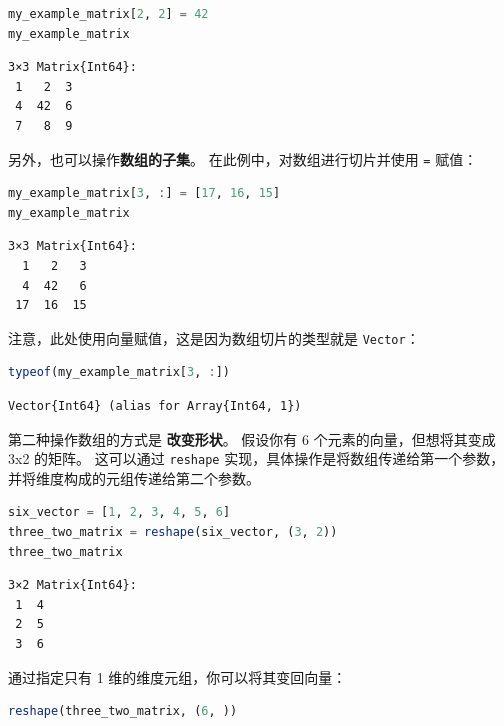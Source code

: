 \documentclass[
  notoc %
]{tufte-book}
\newcommand{\passthrough}[1]{#1}
\begin{document}
\begin{lstlisting}[language=Julia]
my_example_matrix[2, 2] = 42
my_example_matrix
\end{lstlisting}

\begin{lstlisting}[language=Output]
3×3 Matrix{Int64}:
 1   2  3
 4  42  6
 7   8  9
\end{lstlisting}

另外，也可以操作\textbf{数组的子集}。 在此例中，对数组进行切片并使用
\passthrough{\lstinline!=!} 赋值：

\begin{lstlisting}[language=Julia]
my_example_matrix[3, :] = [17, 16, 15]
my_example_matrix
\end{lstlisting}

\begin{lstlisting}[language=Output]
3×3 Matrix{Int64}:
  1   2   3
  4  42   6
 17  16  15
\end{lstlisting}

注意，此处使用向量赋值，这是因为数组切片的类型就是
\passthrough{\lstinline!Vector!}：

\begin{lstlisting}[language=Julia]
typeof(my_example_matrix[3, :])
\end{lstlisting}

\begin{lstlisting}[language=Output]
Vector{Int64} (alias for Array{Int64, 1})
\end{lstlisting}

第二种操作数组的方式是 \textbf{改变形状}。 假设你有 6
个元素的向量，但想将其变成 3x2 的矩阵。 这可以通过
\passthrough{\lstinline!reshape!}
实现，具体操作是将数组传递给第一个参数，并将维度构成的元组传递给第二个参数。

\begin{lstlisting}[language=Julia]
six_vector = [1, 2, 3, 4, 5, 6]
three_two_matrix = reshape(six_vector, (3, 2))
three_two_matrix
\end{lstlisting}

\begin{lstlisting}[language=Output]
3×2 Matrix{Int64}:
 1  4
 2  5
 3  6
\end{lstlisting}

通过指定只有 1 维的维度元组，你可以将其变回向量：

\begin{lstlisting}[language=Julia]
reshape(three_two_matrix, (6, ))
\end{lstlisting}
\end{document}
